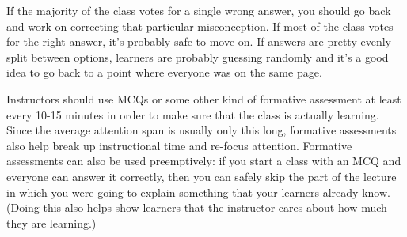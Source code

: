 If the majority of the class votes for a single wrong answer, you should go back
and work on correcting that particular misconception.  If most of the class votes
for the right answer, it's probably safe to move on.  If answers are pretty evenly
split between options, learners are probably guessing randomly and it's a good
idea to go back to a point where everyone was on the same page.

Instructors should use MCQs
or some other kind of formative assessment
at least every 10-15 minutes
in order to make sure that the class is actually learning.
Since the average attention span is usually only this long,
formative assessments also help break up instructional time
and re-focus attention.
Formative assessments can also be used preemptively:
if you start a class with an MCQ and everyone can answer it correctly,
then you can safely skip the part of the lecture
in which you were going to explain something that your learners already know.
(Doing this also helps show learners that the instructor cares about how much they are learning.)

